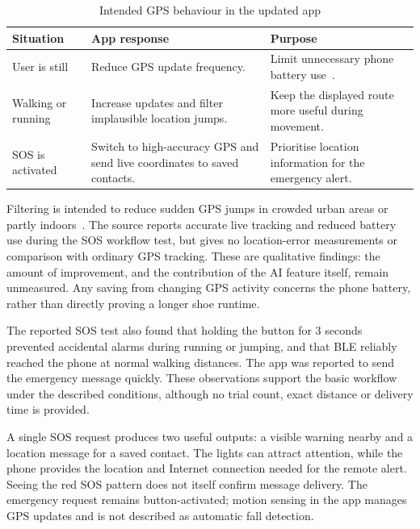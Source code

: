 \begin{table}[H]
    \centering
    \caption{Intended GPS behaviour in the updated app}\label{tab:GPS_behaviour_app}
    \begin{tabularx}{\textwidth}{
        >{\hsize=0.50\hsize\raggedright\arraybackslash}X
        >{\hsize=1.30\hsize\raggedright\arraybackslash}X
        >{\hsize=1.20\hsize\raggedright\arraybackslash}X
    }
    \toprule
    \textbf{Situation} & \textbf{App response} & \textbf{Purpose} \\
    \midrule
    User is still & Reduce GPS update frequency. & Limit unnecessary phone battery use~\cite{android_location_battery}. \\
    \addlinespace
    Walking or running & Increase updates and filter implausible location jumps. & Keep the displayed route more useful during movement. \\
    \addlinespace
    SOS is activated & Switch to high-accuracy GPS and send live coordinates to saved contacts. & Prioritise location information for the emergency alert. \\
    \bottomrule
    \end{tabularx}
\end{table}

Filtering is intended to reduce sudden GPS jumps in crowded urban areas or partly indoors~\cite{weng2023gnss}. The source reports accurate live tracking and reduced battery use during the SOS workflow test, but gives no location-error measurements or comparison with ordinary GPS tracking. These are qualitative findings: the amount of improvement, and the contribution of the AI feature itself, remain unmeasured. Any saving from changing GPS activity concerns the phone battery, rather than directly proving a longer shoe runtime.

The reported SOS test also found that holding the button for 3 seconds prevented accidental alarms during running or jumping, and that BLE reliably reached the phone at normal walking distances. The app was reported to send the emergency message quickly. These observations support the basic workflow under the described conditions, although no trial count, exact distance or delivery time is provided.

A single SOS request produces two useful outputs: a visible warning nearby and a location message for a saved contact. The lights can attract attention, while the phone provides the location and Internet connection needed for the remote alert. Seeing the red SOS pattern does not itself confirm message delivery. The emergency request remains button-activated; motion sensing in the app manages GPS updates and is not described as automatic fall detection.

